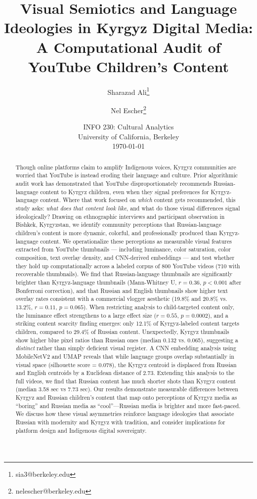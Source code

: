\documentclass[12pt, letterpaper]{article}
\title{
    \Large\textbf{Visual Semiotics and Language Ideologies in Kyrgyz Digital Media:}\\
    \large A Computational Audit of YouTube Children's Content
}
\author{
    Sharazad Ali\thanks{sia3@berkeley.edu} \and
    Nel Escher\thanks{nelescher@berkeley.edu}
}
\date{
    \small INFO 230: Cultural Analytics\\
    \small University of California, Berkeley\\
    \small \today
}
\begin{document}
\maketitle
\thispagestyle{empty}
\newpage


\begin{abstract}
\noindent Though online platforms claim to amplify Indigenous voices, Kyrgyz communities are worried that YouTube is instead eroding their language and culture. Prior algorithmic audit work has demonstrated that YouTube disproportionately recommends Russian-language content to Kyrgyz children, even when they signal preferences for Kyrgyz-language content. Where that work focused on \textit{which} content gets recommended, this study asks: \textit{what does that content look like}, and what do those visual differences signal ideologically? Drawing on ethnographic interviews and participant observation in Bishkek, Kyrgyzstan, we identify community perceptions that Russian-language children's content is more dynamic, colorful, and professionally produced than Kyrgyz-language content. We operationalize these perceptions as measurable visual features extracted from YouTube thumbnails — including luminance, color saturation, color composition, text overlay density, and CNN-derived embeddings — and test whether they hold up computationally across a labeled corpus of 800 YouTube videos (710 with recoverable thumbnails). We find that Russian-language thumbnails are significantly brighter than Kyrgyz-language thumbnails (Mann-Whitney U, $r = 0.36$, $p < 0.001$ after Bonferroni correction), and that Russian and English thumbnails show higher text overlay rates consistent with a commercial vlogger aesthetic (19.8\% and 20.8\% vs. 13.2\%, $r = 0.11$, $p = 0.065$). When restricting analysis to child-targeted content only, the luminance effect strengthens to a large effect size ($r = 0.55$, $p = 0.0002$), and a striking content scarcity finding emerges: only 12.1\% of Kyrgyz-labeled content targets children, compared to 29.4\% of Russian content. Unexpectedly, Kyrgyz thumbnails show higher blue pixel ratios than Russian ones (median 0.132 vs. 0.065), suggesting a \textit{distinct} rather than simply deficient visual register. A CNN embedding analysis using MobileNetV2 and UMAP reveals that while language groups overlap substantially in visual space (silhouette score = 0.078), the Kyrgyz centroid is displaced from Russian and English centroids by a Euclidean distance of 2.73. Extending this analysis to the full videos, we find that Russian content has much shorter shots than Kyrgyz content (median 3.58 sec vs 7.73 sec). Our results demonstrate measurable differences between Kyrgyz and Russian children's content that map onto perceptions of Kyrgyz media as ``boring'' and Russian media as ``cool''---Russian media is brighter and more fast-paced. We discuss how these visual asymmetries reinforce language ideologies that associate Russian with modernity and Kyrgyz with tradition, and consider implications for platform design and Indigenous digital sovereignty.


\end{abstract}
\end{document}
